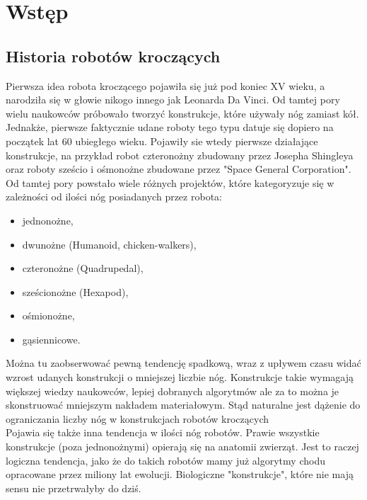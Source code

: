 \chapter{Wstęp}
\label{cha:wprowadzenie}
\section{Historia robotów kroczących}
Pierwsza idea robota kroczącego pojawiła się już pod koniec XV wieku, a narodziła się w głowie nikogo innego jak Leonarda Da Vinci. Od tamtej pory wielu naukowców próbowało tworzyć konstrukcje, które używały nóg zamiast kół. Jednakże, pierwsze faktycznie udane roboty tego typu datuje się dopiero na początek lat 60 ubiegłego wieku. Pojawiły sie wtedy pierwsze działające konstrukcje, na przykład robot czteronożny zbudowany przez Josepha Shingleya oraz roboty sześcio i ośmonożne zbudowane przez "Space General Corporation". \cite{history}\\

Od tamtej pory powstało wiele różnych projektów, które kategoryzuje się w zależności od ilości nóg posiadanych przez robota:
\begin{itemize}[noitemsep]
\item jednonożne,
\item dwunożne (Humanoid, chicken-walkers),
\item czteronożne (Quadrupedal),
\item sześcionożne (Hexapod),
\item ośmionożne,
\item gąsiennicowe.
\end{itemize}

Można tu zaobserwować pewną tendencję spadkową, wraz z upływem czasu widać wzrost udanych konstrukcji o mniejszej liczbie nóg. Konstrukcje takie wymagają większej wiedzy naukowców, lepiej dobranych algorytmów ale za to można je skonstruować mniejszym nakładem materiałowym. Stąd naturalne jest dążenie do ograniczania liczby nóg w konstrukcjach robotów kroczących\\

Pojawia się także inna tendencja w ilości nóg robotów. Prawie wszystkie konstrukcje (poza jednonożnymi) opierają się na anatomii zwierząt. Jest to raczej logiczna tendencja, jako że do takich robotów mamy już algorytmy chodu opracowane przez miliony lat ewolucji. Biologiczne "konstrukcje", które nie mają sensu nie przetrwałyby do dziś. \cite{history}\\

